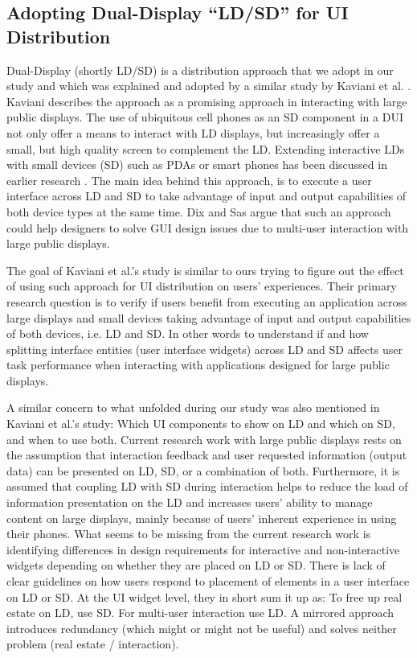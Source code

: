 \subsection{Adopting Dual-Display ``LD/SD'' for UI Distribution}
Dual-Display (shortly LD/SD) is a distribution approach that we adopt in
our study and which was explained and adopted by a similar study by Kaviani et al.
\cite{kaviani2011dual}. Kaviani describes the approach as a promising approach
in interacting with large public displays. The use of ubiquitous cell
phones as an SD component in a DUI not only offer a means to interact with LD
displays, but increasingly offer a small, but high quality screen to complement
the LD. Extending interactive LDs with small devices (SD) such
as PDAs or smart phones has been discussed in earlier research \cite{dix2008public}. The main idea behind this approach, is to execute a user
interface across LD and SD to take advantage of input and output capabilities of
both device types at the same time. Dix and Sas \cite{dix2008public} argue that
such an approach could help designers to solve GUI design issues due to
multi-user interaction with large public displays. 

The goal of Kaviani et al.'s study is similar to ours trying to figure out
the effect of using such approach for UI distribution on users' experiences.
Their primary research question is to verify if users benefit from executing an application across large displays and small devices taking advantage of input
and output capabilities of both devices, i.e. LD and SD. In other words to understand if and how splitting interface entities (user interface widgets) across LD and SD affects user task performance when interacting with applications designed for large public displays.\par
A similar concern to what unfolded during our study was also mentioned in
Kaviani et al.'s study: Which UI components to show on LD and which on SD, and
when to use both. Current research work with large public displays rests on the
assumption that interaction feedback and user requested information (output data) can be presented on LD, SD, or a combination of both. Furthermore, it is assumed that
coupling LD with SD during interaction helps to reduce the load of information
presentation on the LD and increases users’ ability to manage content on large
displays, mainly because of users’ inherent experience in using their phones.
What seems to be missing from the current research work is identifying
differences in design requirements for interactive and non-interactive widgets
depending on whether they are placed on LD or SD. There is lack of clear
guidelines on how users respond to placement of elements in a user interface on
LD or SD. At the UI widget level, they in short sum it up as: To free up real
estate on LD, use SD. For multi-user interaction use LD. A mirrored approach introduces redundancy (which might or might not be useful) and solves neither problem (real estate / interaction).

